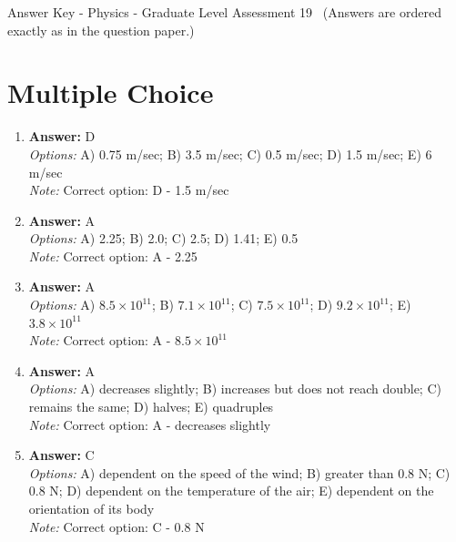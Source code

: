 \documentclass[12pt]{article}
\begin{document}
\begin{center}
Answer Key - Physics - Graduate Level Assessment 19 \
\small (Answers are ordered exactly as in the question paper.)
\end{center}

\section*{Multiple Choice}
\begin{enumerate}[label=\arabic*.]
\item \textbf{Answer:} D
\\ \textit{Options:} A) 0.75 m/sec; B) 3.5 m/sec; C) 0.5 m/sec; D) 1.5 m/sec; E) 6 m/sec
\\ \textit{Note:} Correct option: D - 1.5 m/sec
\item \textbf{Answer:} A
\\ \textit{Options:} A) 2.25; B) 2.0; C) 2.5; D) 1.41; E) 0.5
\\ \textit{Note:} Correct option: A - 2.25
\item \textbf{Answer:} A
\\ \textit{Options:} A) $8.5 \times 10^{11}$; B) $7.1 \times 10^{11}$; C) $7.5 \times 10^{11}$; D) $9.2 \times 10^{11}$; E) $3.8 \times 10^{11}$
\\ \textit{Note:} Correct option: A - $8.5 \times 10^{11}$
\item \textbf{Answer:} A
\\ \textit{Options:} A) decreases slightly; B) increases but does not reach double; C) remains the same; D) halves; E) quadruples
\\ \textit{Note:} Correct option: A - decreases slightly
\item \textbf{Answer:} C
\\ \textit{Options:} A) dependent on the speed of the wind; B) greater than 0.8 N; C) 0.8 N; D) dependent on the temperature of the air; E) dependent on the orientation of its body
\\ \textit{Note:} Correct option: C - 0.8 N
\end{enumerate}
\end{document}
